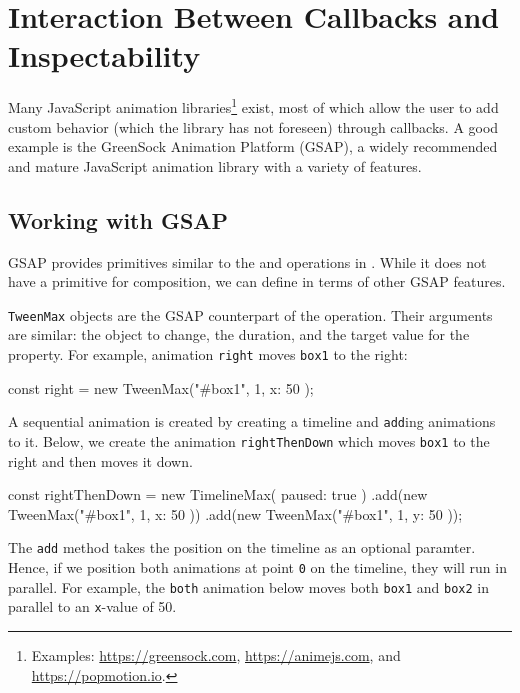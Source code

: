 \section{Interaction Between Callbacks and Inspectability}
\label{sec:evaluation}

Many JavaScript animation libraries\footnote{Examples:
\url{https://greensock.com}, \url{https://animejs.com}, and
\url{https://popmotion.io}.} exist, most of which allow the user to add custom
behavior (which the library has not foreseen) through callbacks. A good example
is the GreenSock Animation Platform (GSAP), a widely recommended and mature
JavaScript animation library with a variety of features.

\subsection{Working with GSAP}

GSAP provides primitives similar to the  and
 operations in \dsl{}. While it does not have a primitive for
 composition, we can define in terms of other GSAP features.

\texttt{TweenMax} objects are the GSAP counterpart of the
 operation. Their arguments are similar: the object to change, the
duration, and the target value for the
property. For example, animation \texttt{right} moves
\texttt{box1} to the right:

\begin{js}
const right = new TweenMax("#box1", 1, { x: 50 });
\end{js}

A sequential animation is created by creating a timeline and \texttt{add}ing
animations to it.  Below, we create the animation \texttt{rightThenDown} which
moves \texttt{box1} to the right and then moves it down.

\begin{js}
const rightThenDown = new TimelineMax({ paused: true })
  .add(new TweenMax("#box1", 1, { x: 50 }))
  .add(new TweenMax("#box1", 1, { y: 50 }));
\end{js}


The \texttt{add} method takes the position on the timeline as an optional
paramter. Hence, if we position both animations at point \texttt{0} on the timeline,
they will run in parallel. For example, the \texttt{both} animation below 
moves both \texttt{box1} and \texttt{box2} in parallel to an \texttt{x}-value
of 50.

